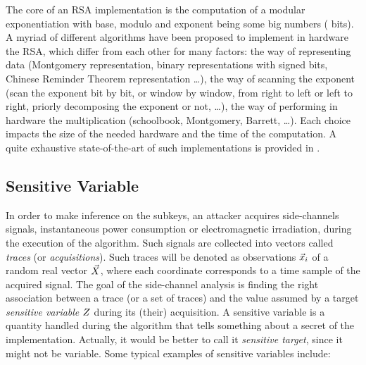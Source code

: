 \begin{remark}
The core of an RSA implementation is the computation of a modular exponentiation with base, modulo and exponent being some big numbers ( bits). A myriad of different algorithms have been proposed to implement in hardware the RSA, which differ from each other for many factors: the way of representing data (\eg Montgomery representation, binary representations with signed bits, Chinese Reminder Theorem representation \dots), the way of scanning the exponent (\eg scan the exponent bit by bit, or window by window, from right to left or left to right, priorly decomposing the exponent or not, \dots), the way of performing in hardware the multiplication (\eg schoolbook, Montgomery, Barrett, \dots). Each choice impacts the size of the needed hardware and the time of the computation. A quite exhaustive state-of-the-art of such implementations is provided in \cite{koc1994high}. 
\end{remark}

\subsection{Sensitive Variable}\label{sec:sensVar}
In order to make inference on the subkeys, an attacker acquires side-channels signals, \eg instantaneous power consumption or electromagnetic irradiation, during the execution of the algorithm. Such signals are collected into vectors called \emph{traces} (or \emph{acquisitions}). Such traces will be denoted as observations $\vec{x}_i$ of a random real vector $\vec{X}$, where each coordinate corresponds to a time sample of the acquired signal. The goal of the side-channel analysis is finding the right association between a trace (or a set of traces) and the value assumed by a target \emph{sensitive variable} $Z$ during its (their) acquisition. A sensitive variable is a quantity handled during the algorithm that tells something about a secret of the implementation. Actually, it would be better to call it \emph{sensitive target}, since it might not be variable. Some typical examples of sensitive variables include: 



